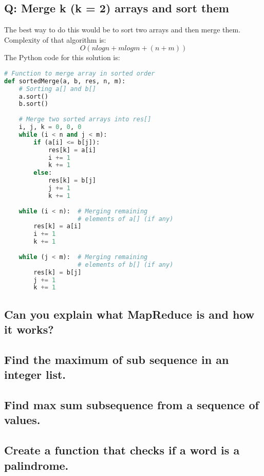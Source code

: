 \subsection{Q: Merge k (k = 2) arrays and sort them}
The best way to do this would be to sort two arrays and then merge them. 
Complexity of that algorithm is: \[O(nlogn + mlogm + (n + m))\]
The Python code for this solution is:
\begin{lstlisting}[language=python]
# Function to merge array in sorted order
def sortedMerge(a, b, res, n, m):
    # Sorting a[] and b[]
    a.sort()
    b.sort()
     
    # Merge two sorted arrays into res[]
    i, j, k = 0, 0, 0
    while (i < n and j < m):
        if (a[i] <= b[j]):
            res[k] = a[i]
            i += 1
            k += 1
        else:
            res[k] = b[j]
            j += 1
            k += 1
             
    while (i < n):  # Merging remaining
                    # elements of a[] (if any)
        res[k] = a[i]
        i += 1
        k += 1
         
    while (j < m):  # Merging remaining
                    # elements of b[] (if any)
        res[k] = b[j]
        j += 1
        k += 1
\end{lstlisting}
\subsection{Can you explain what MapReduce is and how it works?}
\subsection{Find the maximum of sub sequence in an integer list.}
\subsection{Find max sum subsequence from a sequence of values.}
\subsection{Create a function that checks if a word is a palindrome.}